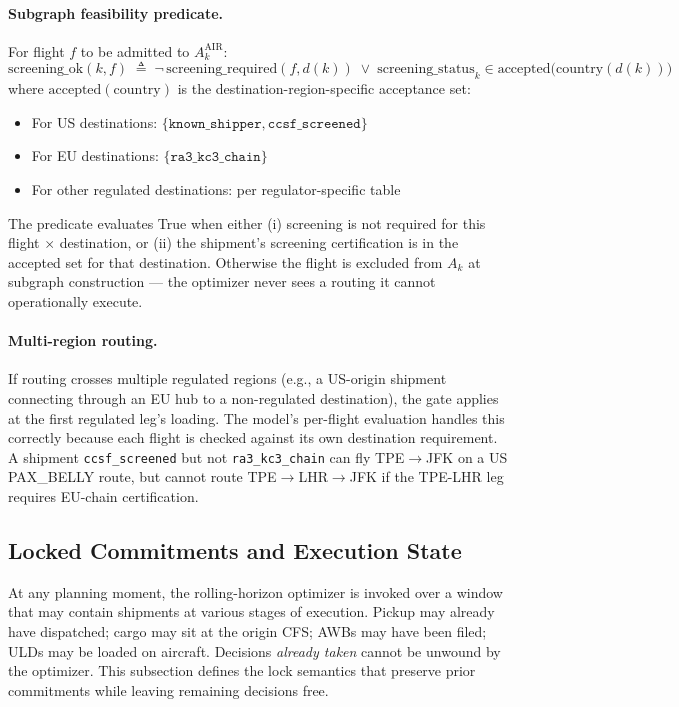 \documentclass[11pt,a4paper]{article}
\newcommand{\defeq}{\triangleq}
\theoremstyle{definition}
\begin{document}
\paragraph{Subgraph feasibility predicate.}
For flight $f$ to be admitted to $A_k^{\text{AIR}}$:
\begin{equation}
  \text{screening\_ok}(k, f) \;\defeq\;
    \neg\, \text{screening\_required}(f, d(k))
    \;\vee\;
    \text{screening\_status}_k \in \text{accepted}\bigl(\text{country}(d(k))\bigr)
  \label{eq:screening-ok}
\end{equation}
where $\text{accepted}(\text{country})$ is the destination-region-specific acceptance
set:
\begin{itemize}[noitemsep]
  \item For US destinations: $\{\texttt{known\_shipper}, \texttt{ccsf\_screened}\}$
  \item For EU destinations: $\{\texttt{ra3\_kc3\_chain}\}$
  \item For other regulated destinations: per regulator-specific table
\end{itemize}
The predicate evaluates True when either (i) screening is not required for this flight
$\times$ destination, or (ii) the shipment's screening certification is in the accepted
set for that destination. Otherwise the flight is excluded from $A_k$ at subgraph
construction --- the optimizer never sees a routing it cannot operationally execute.

\paragraph{Multi-region routing.}
If routing crosses multiple regulated regions (e.g., a US-origin shipment connecting
through an EU hub to a non-regulated destination), the gate applies at the first
regulated leg's loading. The model's per-flight evaluation handles this correctly
because each flight is checked against its own destination requirement. A shipment
\texttt{ccsf\_screened} but not \texttt{ra3\_kc3\_chain} can fly TPE$\to$JFK on a US
PAX\_BELLY route, but cannot route TPE$\to$LHR$\to$JFK if the TPE-LHR leg requires
EU-chain certification.

\subsection{Locked Commitments and Execution State}
\label{sec:locked-commitments}

At any planning moment, the rolling-horizon optimizer is invoked over a window that
may contain shipments at various stages of execution. Pickup may already have
dispatched; cargo may sit at the origin CFS; AWBs may have been filed; ULDs may be
loaded on aircraft. Decisions \emph{already taken} cannot be unwound by the optimizer.
This subsection defines the lock semantics that preserve prior commitments while
leaving remaining decisions free.
\end{document}
